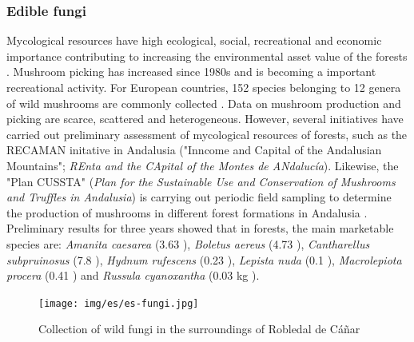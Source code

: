 \subsubsection{Edible fungi}\label{sec:es:provision-fungi}
Mycological resources have high ecological, social, recreational and economic importance contributing to increasing the environmental asset value of the forests \autocites{MartinezPenaetal2015RentaAmbiental}. Mushroom picking has increased since 1980s and is becoming a important recreational activity. For European countries, 152 species belonging to 12 genera of wild mushrooms are commonly collected \autocites{Schulpetal2014WildFood}. Data on mushroom production and picking are scarce, scattered and heterogeneous. However, several initiatives have carried out preliminary assessment of mycological resources of forests, such as the RECAMAN initative in Andalusia ("Inncome and Capital of the Andalusian Mountains"; \emph{REnta and the CApital of the Montes de ANdalucía})\autocites{MartinezPenaetal2015RentaAmbiental}. Likewise, the "Plan CUSSTA" (\emph{Plan for the Sustainable Use and Conservation of Mushrooms and Truffles in Andalusia}) is carrying out periodic field sampling to determine the production of mushrooms in different forest formations in Andalusia \autocites{RayaLopezetal2017MuestreosPara}. Preliminary results for three years showed that in \Qp forests, the main marketable species are: \emph{Amanita caesarea} (3.63 \khy), \emph{Boletus aereus} (4.73 \khy), \emph{Cantharellus subpruinosus} (7.8 \khy), \emph{Hydnum rufescens} (0.23 \khy), \emph{Lepista nuda} (0.1 \khy), \emph{Macrolepiota procera} (0.41 \khy) and \emph{Russula cyanoxantha} (0.03 kg \khy). 

\begin{figure}
    \centering
    \texttt{[image: img/es/es-fungi.jpg]}\caption{Collection of wild fungi in the surroundings of Robledal de Cáñar}\label{fig:es:fungi}
\end{figure}


